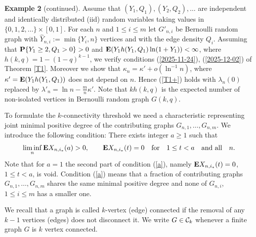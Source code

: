 \documentclass[11pt, a4paper]{article}
\newcommand{\E}{{\bf{E}}}
\newcommand{\PP}{{\bf{P}}}
\begin{document}
 
 {\bf Example 2} (continued). Assume that $(Y_1,Q_1), (Y_2,Q_2),\dots $ are independent and  iden\-tically distributed (iid) random variables taking values in 
 $\{0,1,2,\dots\}\times[0,1]$. For each $n$ and $1\le i\le m$ 
 let $G'_{n,i}$ be Bernoulli random graph with 
 ${\hat Y}_{n,i}:=\min\{Y_i,n\}$ vertices and with the edge density $Q_i$. 
 Assuming that 
 $\PP\{Y_1\ge 2, Q_1>0\}>0$
 and 
 $\E (Y_1h(Y_1,Q_1)\ln(1+Y_1))<\infty$, 
 where $h(k,q)=1-(1-q)^{k-1}$,
we 
verify conditions (\ref{2025-11-24}), (\ref{2025-12-02}) of Theorem \ref{T1}. Moreover we show  that 
$\kappa_n=\kappa'+o(\ln^{-1}n)$, where $\kappa'=\E (Y_1h(Y_1,Q_1))$
 does not depend on $n$. Hence 
 (\ref{T1+}) holds with 
 $\lambda_{n}(0)$ replaced by $\lambda'_{n}=\ln n-\frac{m}{n}\kappa'$. Note that  $kh(k,q)$ is the 
expected number of non-isolated vertices in Bernoulli 
random graph $G(k,q)$.




 
 To formulate the $k$-connectivity threshold we need a characteristic representing joint 
 minimal positive degree of the contributing graphs $G_{n,1},\dots, G_{n,m}$. We introduce the following condition:
There exists integer $a\ge 1$  such that
\begin{align}
\label{a}
\liminf_n\E X_{n,i_*}(a)>0,
\qquad
\E X_{n,i_*}(t)=0 
\quad
{\text{for}}
\quad 
1\le t<a
\quad
{\text{and\ all}} \quad n.
\end{align}
Note that for $a=1$ the second part of condition (\ref{a}), namely $\E X_{n,i_*}(t)=0$, $1\le t<a$, is void. Condition 
(\ref{a}) means that a fraction of contributing graphs $G_{n,1},\dots, G_{n,m}$ shares the same minimal positive degree and none of $G_{n,i}$, $1\le i\le m$ has a smaller one.

 We recall that a graph is called $k$-vertex (edge) connected if the removal of any $k-1$ vertices (edges) does not disconnect
it.
We write $G\in{\cal C}_k$ whenever a finite graph $G$ is $k$ vertex connected. 
 
 
 
\end{document}
